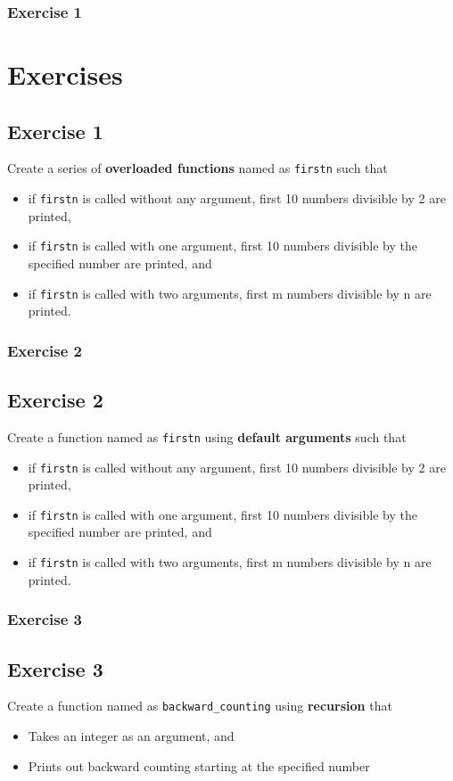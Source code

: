 \documentclass{beamer}
\begin{document}
\begin{frame}\frametitle{Exercise 1}
\section{Exercises} %
\label{sec:exercises}
\subsection{Exercise 1} %
\label{sub:exercise_1}
Create a series of \textbf{overloaded functions} named as \texttt{firstn} such that
\begin{itemize}
    \item if \texttt{firstn} is called without any argument, first 10 numbers divisible by 2 are printed,
    \item if \texttt{firstn} is called with one argument, first 10 numbers divisible by the specified number are printed, and
    \item if \texttt{firstn} is called with two arguments, first m numbers divisible by n are printed.
\end{itemize}
\end{frame}

\begin{frame}\frametitle{Exercise 2}
\subsection{Exercise 2} %
\label{sub:exercise_2}
Create a function named as \texttt{firstn} using \textbf{default arguments} such that
\begin{itemize}
    \item if \texttt{firstn} is called without any argument, first 10 numbers divisible by 2 are printed,
    \item if \texttt{firstn} is called with one argument, first 10 numbers divisible by the specified number are printed, and
    \item if \texttt{firstn} is called with two arguments, first m numbers divisible by n are printed.
\end{itemize}
\end{frame}

\begin{frame}\frametitle{Exercise 3}
\subsection{Exercise 3} %
\label{sub:exercise_3}
Create a function named as \texttt{backward\_counting} using \textbf{recursion} that
\begin{itemize}
    \item Takes an integer as an argument, and
    \item Prints out backward counting starting at the specified number
\end{itemize}
\end{frame}
\end{document}
